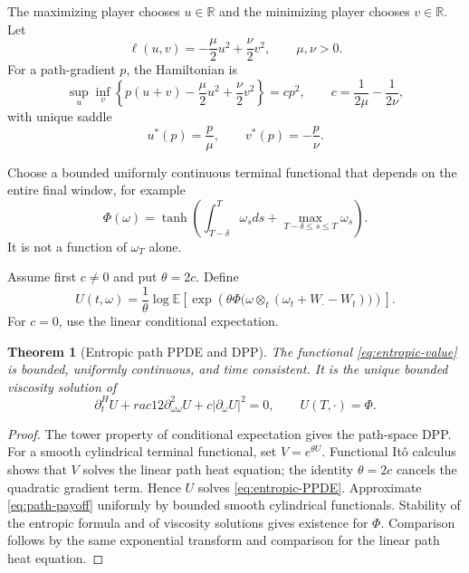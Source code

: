 \documentclass[11pt,reqno]{amsart}
\newtheorem{theorem}{Theorem}[section]
\theoremstyle{definition}
\theoremstyle{remark}
\newcommand{\E}{\mathbb E}
\newcommand{\R}{\mathbb R}
\newcommand{\abs}[1]{\left\lvert #1\right\rvert}
\begin{document}
The maximizing player chooses $u\in\R$ and the minimizing player chooses
$v\in\R$.  Let
\begin{equation}\label{eq:running-game}
 \ell(u,v)=-\frac\mu2u^2+\frac\nu2v^2,
 \qquad \mu,\nu>0.
\end{equation}
For a path-gradient $p$, the Hamiltonian is
\begin{equation}\label{eq:path-Hamiltonian}
 \sup_u\inf_v\left\{p(u+v)-\frac\mu2u^2+\frac\nu2v^2\right\}
 =c p^2,
 \qquad
 c=\frac1{2\mu}-\frac1{2\nu},
\end{equation}
with unique saddle
\begin{equation}\label{eq:path-saddle}
 u^*(p)=\frac p\mu,
 \qquad
 v^*(p)=-\frac p\nu.
\end{equation}

Choose a bounded uniformly continuous terminal functional that depends on the
entire final window, for example
\begin{equation}\label{eq:path-payoff}
 \Phi(\omega)=\tanh\left(
 \int_{T-\delta}^T\omega_sds+
 \max_{T-\delta\le s\le T}\omega_s
 \right).
\end{equation}
It is not a function of $\omega_T$ alone.

Assume first $c\ne0$ and put $\theta=2c$.  Define
\begin{equation}\label{eq:entropic-value}
 U(t,\omega)=\frac1\theta\log\E\left[
 \exp\left(\theta\Phi\bigl(
 \omega\otimes_t(\omega_t+W_\cdot-W_t)
 \bigr)\right)\right].
\end{equation}
For $c=0$, use the linear conditional expectation.

\begin{theorem}[Entropic path PPDE and DPP]\label{thm:entropic-PPDE}
The functional \eqref{eq:entropic-value} is bounded, uniformly continuous, and
time consistent.  It is the unique bounded viscosity solution of
\begin{equation}\label{eq:entropic-PPDE}
 \partial_t^HU+rac12\partial_{\omega\omega}^2U
 +c\abs{\partial_\omega U}^2=0,
 \qquad U(T,\cdot)=\Phi.
\end{equation}
\end{theorem}

\begin{proof}
The tower property of conditional expectation gives the path-space DPP.
For a smooth cylindrical terminal functional, set $V=e^{\theta U}$.  Functional
It\^o calculus shows that $V$ solves the linear path heat equation; the identity
$\theta=2c$ cancels the quadratic gradient term.  Hence $U$ solves
\eqref{eq:entropic-PPDE}.  Approximate \eqref{eq:path-payoff} uniformly by
bounded smooth cylindrical functionals.  Stability of the entropic formula and
of viscosity solutions gives existence for $\Phi$.  Comparison follows by the
same exponential transform and comparison for the linear path heat equation.
\end{proof}
\end{document}
